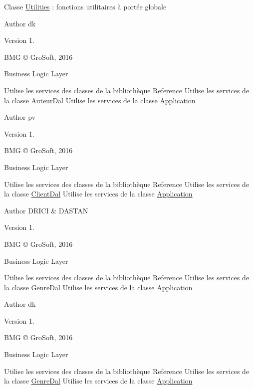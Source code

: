 Classe \hyperlink{class_utilities}{Utilities} \+: fonctions utilitaires à portée globale

\begin{DoxyAuthor}{Author}
dk 
\end{DoxyAuthor}
\begin{DoxyVersion}{Version}
1.
\end{DoxyVersion}
B\+MG © Gro\+Soft, 2016

Business Logic Layer

Utilise les services des classes de la bibliothèque Reference Utilise les services de la classe \hyperlink{class_auteur_dal}{Auteur\+Dal} Utilise les services de la classe \hyperlink{class_application}{Application}

\begin{DoxyAuthor}{Author}
pv 
\end{DoxyAuthor}
\begin{DoxyVersion}{Version}
1.
\end{DoxyVersion}
B\+MG © Gro\+Soft, 2016

Business Logic Layer

Utilise les services des classes de la bibliothèque Reference Utilise les services de la classe \hyperlink{class_client_dal}{Client\+Dal} Utilise les services de la classe \hyperlink{class_application}{Application}

\begin{DoxyAuthor}{Author}
D\+R\+I\+CI \& D\+A\+S\+T\+AN 
\end{DoxyAuthor}
\begin{DoxyVersion}{Version}
1.
\end{DoxyVersion}
B\+MG © Gro\+Soft, 2016

Business Logic Layer

Utilise les services des classes de la bibliothèque Reference Utilise les services de la classe \hyperlink{class_genre_dal}{Genre\+Dal} Utilise les services de la classe \hyperlink{class_application}{Application}

\begin{DoxyAuthor}{Author}
dk 
\end{DoxyAuthor}
\begin{DoxyVersion}{Version}
1.
\end{DoxyVersion}
B\+MG © Gro\+Soft, 2016

Business Logic Layer

Utilise les services des classes de la bibliothèque Reference Utilise les services de la classe \hyperlink{class_genre_dal}{Genre\+Dal} Utilise les services de la classe \hyperlink{class_application}{Application}

